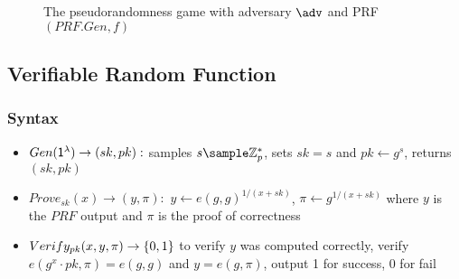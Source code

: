 \begin{figure}
\begin{pchstack}[boxed, center, space=1em]
\end{pchstack}
  \caption{The pseudorandomness game with adversary $\adv$ and PRF $(PRF.Gen, f)$}
  \label{fig:prf}
\end{figure}


\subsection{Verifiable Random Function}

\subsubsection{Syntax}
\begin{itemize}
    \item $Gen(\mathsf{1^{\lambda}}) \to (sk, pk):$ samples $s \sample \Zp^*$, sets $sk = s$ and $pk \gets g^s$, returns $(sk, pk)$
    \item $Prove_{sk}(x) \to (y, \pi):$ $y \gets e(g,g)^{1/(x+sk)}$, $\pi \gets g^{1/(x+sk)}$ where $y$ is the $PRF$ output and $\pi$ is the proof of correctness
    \item $Verify_{pk}(x, y, \pi) \to \{0,1\}$ to verify $y$ was computed correctly, verify $e(g^x \cdot pk, \pi) = e(g,g)$ and $y = e(g, \pi)$, output 1 for success, 0 for fail
\end{itemize}


